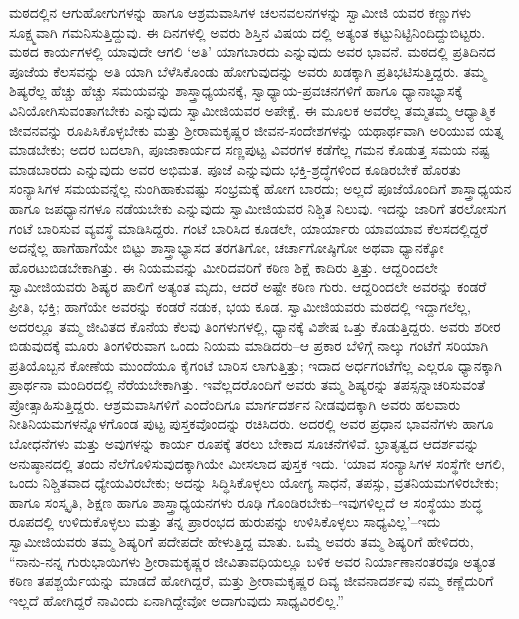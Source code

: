 ಮಠದಲ್ಲಿನ ಆಗುಹೋಗುಗಳನ್ನು ಹಾಗೂ ಆಶ್ರಮವಾಸಿಗಳ ಚಲನವಲನಗಳನ್ನು ಸ್ವಾಮೀಜಿ ಯವರ ಕಣ್ಣುಗಳು ಸೂಕ್ಷ್ಮವಾಗಿ ಗಮನಿಸುತ್ತಿದ್ದುವು. ಈ ದಿನಗಳಲ್ಲಿ ಅವರು ಶಿಸ್ತಿನ ವಿಷಯ ದಲ್ಲಿ ಅತ್ಯಂತ ಕಟ್ಟುನಿಟ್ಟಿನಿಂದಿದ್ದುಬಿಟ್ಟರು. ಮಠದ ಕಾರ್ಯಗಳಲ್ಲಿ ಯಾವುದೇ ಆಗಲಿ ‘ಅತಿ’ ಯಾಗಬಾರದು ಎನ್ನುವುದು ಅವರ ಭಾವನೆ. ಮಠದಲ್ಲಿ ಪ್ರತಿದಿನದ ಪೂಜೆಯ ಕೆಲಸವನ್ನು ಅತಿ ಯಾಗಿ ಬೆಳೆಸಿಕೊಂಡು ಹೋಗುವುದನ್ನು ಅವರು ಖಡಕ್ಕಾಗಿ ಪ್ರತಿಭಟಿಸುತ್ತಿದ್ದರು. ತಮ್ಮ ಶಿಷ್ಯರೆಲ್ಲ ಹೆಚ್ಚು ಹೆಚ್ಚು ಸಮಯವನ್ನು ಶಾಸ್ತ್ರಾಧ್ಯಯನಕ್ಕೆ, ಸ್ವಾಧ್ಯಾಯ-ಪ್ರವಚನಗಳಿಗೆ ಹಾಗೂ ಧ್ಯಾನಾಭ್ಯಾಸಕ್ಕೆ ವಿನಿಯೋಗಿಸುವಂತಾಗಬೇಕು ಎನ್ನುವುದು ಸ್ವಾಮೀಜಿಯವರ ಅಪೇಕ್ಷೆ. ಈ ಮೂಲಕ ಅವರೆಲ್ಲ ತಮ್ಮತಮ್ಮ ಆಧ್ಯಾತ್ಮಿಕ ಜೀವನವನ್ನು ರೂಪಿಸಿಕೊಳ್ಳಬೇಕು ಮತ್ತು ಶ್ರೀರಾಮಕೃಷ್ಣರ ಜೀವನ-ಸಂದೇಶಗಳನ್ನು ಯಥಾರ್ಥವಾಗಿ ಅರಿಯುವ ಯತ್ನ ಮಾಡಬೇಕು; ಅದರ ಬದಲಾಗಿ, ಪೂಜಾಕಾರ್ಯದ ಸಣ್ಣಪುಟ್ಟ ವಿವರಗಳ ಕಡೆಗೆಲ್ಲ ಗಮನ ಕೊಡುತ್ತ ಸಮಯ ನಷ್ಟ ಮಾಡಬಾರದು ಎನ್ನುವುದು ಅವರ ಅಭಿಮತ. ಪೂಜೆ ಎನ್ನುವುದು ಭಕ್ತಿ-ಶ್ರದ್ಧೆಗಳಿಂದ ಕೂಡಿರಬೇಕೆ ಹೊರತು ಸಂನ್ಯಾಸಿಗಳ ಸಮಯವನ್ನೆಲ್ಲ ನುಂಗಿಹಾಕುವಷ್ಟು ಸಂಭ್ರಮಕ್ಕೆ ಹೋಗ ಬಾರದು; ಅಲ್ಲದೆ ಪೂಜೆಯೊಂದಿಗೆ ಶಾಸ್ತ್ರಾಧ್ಯಯನ ಹಾಗೂ ಜಪಧ್ಯಾನಗಳೂ ನಡೆಯಬೇಕು ಎನ್ನುವುದು ಸ್ವಾಮೀಜಿಯವರ ನಿಶ್ಚಿತ ನಿಲುವು. ಇದನ್ನು ಜಾರಿಗೆ ತರಲೋಸುಗ ಗಂಟೆ ಬಾರಿಸುವ ವ್ಯವಸ್ಥೆ ಮಾಡಿಸಿದ್ದರು. ಗಂಟೆ ಬಾರಿಸಿದ ಕೂಡಲೇ, ಯಾರ್ಯಾರು ಯಾವಯಾವ ಕೆಲಸದಲ್ಲಿದ್ದರೆ ಅದನ್ನೆಲ್ಲ ಹಾಗೆಹಾಗೆಯೇ ಬಿಟ್ಟು ಶಾಸ್ತ್ರಾಭ್ಯಾಸದ ತರಗತಿಗೋ, ಚರ್ಚಾಗೋಷ್ಠಿಗೋ ಅಥವಾ ಧ್ಯಾನಕ್ಕೋ ಹೊರಟುಬಿಡಬೇಕಾಗಿತ್ತು. ಈ ನಿಯಮವನ್ನು ಮೀರಿದವರಿಗೆ ಕಠಿಣ ಶಿಕ್ಷೆ ಕಾದಿರು ತ್ತಿತ್ತು. ಆದ್ದರಿಂದಲೇ ಸ್ವಾಮೀಜಿಯವರು ಶಿಷ್ಯರ ಪಾಲಿಗೆ ಅತ್ಯಂತ ಮೃದು, ಆದರೆ ಅಷ್ಟೇ ಕಠಿಣ ಗುರು. ಆದ್ದರಿಂದಲೇ ಅವರನ್ನು ಕಂಡರೆ ಪ್ರೀತಿ, ಭಕ್ತಿ; ಹಾಗೆಯೇ ಅವರನ್ನು ಕಂಡರೆ ನಡುಕ, ಭಯ ಕೂಡ. ಸ್ವಾಮೀಜಿಯವರು ಮಠದಲ್ಲಿ ಇದ್ದಾಗಲೆಲ್ಲ, ಅದರಲ್ಲೂ ತಮ್ಮ ಜೀವಿತದ ಕೊನೆಯ ಕೆಲವು ತಿಂಗಳುಗಳಲ್ಲಿ, ಧ್ಯಾನಕ್ಕೆ ವಿಶೇಷ ಒತ್ತು ಕೊಡುತ್ತಿದ್ದರು. ಅವರು ಶರೀರ ಬಿಡುವುದಕ್ಕೆ ಮೂರು ತಿಂಗಳಿರುವಾಗ ಒಂದು ನಿಯಮ ಮಾಡಿದರು–ಆ ಪ್ರಕಾರ ಬೆಳಿಗ್ಗೆ ನಾಲ್ಕು ಗಂಟೆಗೆ ಸರಿಯಾಗಿ ಪ್ರತಿಯೊಬ್ಬನ ಕೋಣೆಯ ಮುಂದೆಯೂ ಕೈಗಂಟೆ ಬಾರಿಸ ಲಾಗುತ್ತಿತ್ತು; ಇದಾದ ಅರ್ಧಗಂಟೆಗೆಲ್ಲ ಎಲ್ಲರೂ ಧ್ಯಾನಕ್ಕಾಗಿ ಪ್ರಾರ್ಥನಾ ಮಂದಿರದಲ್ಲಿ ನೆರೆಯಬೇಕಾಗಿತ್ತು. ಇವೆಲ್ಲದರೊಂದಿಗೆ ಅವರು ತಮ್ಮ ಶಿಷ್ಯರನ್ನು ತಪಸ್ಸನ್ನಾಚರಿಸುವಂತೆ ಪ್ರೋತ್ಸಾಹಿಸುತ್ತಿದ್ದರು. ಆಶ್ರಮವಾಸಿಗಳಿಗೆ ಎಂದೆಂದಿಗೂ ಮಾರ್ಗದರ್ಶನ ನೀಡವುದಕ್ಕಾಗಿ ಅವರು ಹಲವಾರು ನೀತಿನಿಯಮಗಳನ್ನೊಳಗೊಂಡ ಪುಟ್ಟ ಪುಸ್ತಕವೊಂದನ್ನು ರಚಿಸಿದರು. ಅದರಲ್ಲಿ ಅವರ ಪ್ರಧಾನ ಭಾವನೆಗಳು ಹಾಗೂ ಬೋಧನೆಗಳು ಮತ್ತು ಅವುಗಳನ್ನು ಕಾರ್ಯ ರೂಪಕ್ಕೆ ತರಲು ಬೇಕಾದ ಸೂಚನೆಗಳಿವೆ. ಭ್ರಾತೃತ್ವದ ಆದರ್ಶವನ್ನು ಅನುಷ್ಠಾನದಲ್ಲಿ ತಂದು ನೆಲೆಗೊಳಿಸುವುದಕ್ಕಾಗಿಯೇ ಮೀಸಲಾದ ಪುಸ್ತಕ ಇದು. ‘ಯಾವ ಸಂನ್ಯಾಸಿಗಳ ಸಂಸ್ಥೆಗೇ ಆಗಲಿ, ಒಂದು ನಿಶ್ಚಿತವಾದ ಧ್ಯೇಯವಿರಬೇಕು; ಅದನ್ನು ಸಿದ್ಧಿಸಿಕೊಳ್ಳಲು ಯೋಗ್ಯ ಸಾಧನೆ, ತಪಸ್ಸು, ವ್ರತನಿಯಮಗಳಿರಬೇಕು; ಹಾಗೂ ಸಂಸ್ಕೃತಿ, ಶಿಕ್ಷಣ ಹಾಗೂ ಶಾಸ್ತ್ರಾಧ್ಯಯನಗಳು ರೂಢಿ ಗೊಂಡಿರಬೇಕು–ಇವುಗಳಿಲ್ಲದೆ ಆ ಸಂಸ್ಥೆಯು ಶುದ್ಧ ರೂಪದಲ್ಲಿ ಉಳಿದುಕೊಳ್ಳಲು ಮತ್ತು ತನ್ನ ಪ್ರಾರಂಭದ ಹುರುಪನ್ನು ಉಳಿಸಿಕೊಳ್ಳಲು ಸಾಧ್ಯವಿಲ್ಲ’–ಇದು ಸ್ವಾಮೀಜಿಯವರು ತಮ್ಮ ಶಿಷ್ಯರಿಗೆ ಪದೇಪದೇ ಹೇಳುತ್ತಿದ್ದ ಮಾತು. ಒಮ್ಮೆ ಅವರು ತಮ್ಮ ಶಿಷ್ಯರಿಗೆ ಹೇಳಿದರು, “ನಾನು-ನನ್ನ ಗುರುಭಾಯಿಗಳು ಶ್ರೀರಾಮಕೃಷ್ಣರ ಜೀವಿತಾವಧಿಯಲ್ಲೂ ಬಳಿಕ ಅವರ ನಿರ್ಯಾಣಾನಂತರವೂ ಅತ್ಯಂತ ಕಠಿಣ ತಪಶ್ಚರ್ಯೆಯನ್ನು ಮಾಡದೆ ಹೋಗಿದ್ದರೆ, ಮತ್ತು ಶ್ರೀರಾಮಕೃಷ್ಣರ ದಿವ್ಯ ಜೀವನಾದರ್ಶವು ನಮ್ಮ ಕಣ್ಣೆದುರಿಗೆ ಇಲ್ಲದೆ ಹೋಗಿದ್ದರೆ ನಾವಿಂದು ಏನಾಗಿದ್ದೇವೋ ಅದಾಗುವುದು ಸಾಧ್ಯವಿರಲಿಲ್ಲ.”

